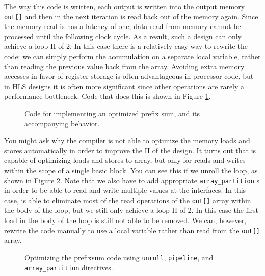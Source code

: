The way this code is written, each output is written into the output memory \lstinline|out[]| and then in the next iteration is read back out of the memory again.  Since the memory read is has a latency of one, data read from memory cannot be processed until the following clock cycle.  As a result, such a design can only achieve a loop II of 2.  In this case there is a relatively easy way to rewrite the code: we can simply perform the accumulation on a separate local variable, rather than reading the previous value back from the array.  Avoiding extra memory accesses in favor of register storage is often advantageous in processor code, but in HLS designs it is often more significant since other operations are rarely a performance bottleneck.  Code that does this is shown in Figure \ref{fig:prefixsum_optimized}.

\begin{figure}
\begin{minipage}{.5\textwidth}

\end{minipage}
\begin{minipage}{.5\textwidth}
\centering

\end{minipage}
\caption{ Code for implementing an optimized prefix sum, and its accompanying behavior. }
\label{fig:prefixsum_optimized}
\end{figure}

You might ask why the compiler is not able to optimize the memory loads and stores automatically in order to improve the II of the design.  It turns out that \VHLS is capable of optimizing loads and stores to array, but only for reads and writes within the scope of a single basic block.  You can see this if we unroll the loop, as shown in Figure \ref{fig:prefixsum_unrolled}.  Note that we also have to add appropriate \lstinline{array_partition} s in order to be able to read and write multiple values at the interfaces.   In this case, \VHLS is able to eliminate most of the read operations of the \lstinline{out[]} array within the body of the loop, but we still only achieve a loop II of 2.  In this case the first load in the body of the loop is still not able to be removed.  We can, however, rewrite the code manually to use a local variable rather than read from the \lstinline{out[]} array.

\begin{figure}
\begin{minipage}{.5\textwidth}

\end{minipage}
\begin{minipage}{.5\textwidth}
\raggedleft

\end{minipage}
\caption{ Optimizing the prefixsum code using \lstinline{unroll}, \lstinline{pipeline}, and \lstinline{array_partition} directives. }
\label{fig:prefixsum_unrolled}
\end{figure}

